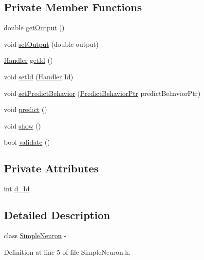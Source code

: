 \subsection*{Private Member Functions}
\begin{DoxyCompactItemize}
\item 
double \hyperlink{class_simple_neuron_ae5a325412827ad1f63e2a75f82023267}{getOutput} ()
\item 
void \hyperlink{class_simple_neuron_af59d76e80aea2bb224b817390f083bf9}{setOutput} (double output)
\item 
\hyperlink{_a_m_o_r_e_8h_abc871abb71cff6655b8172ee7240b8ef}{Handler} \hyperlink{class_simple_neuron_a2ed8cdd977472afaecca2c6b27c6beef}{getId} ()
\item 
void \hyperlink{class_simple_neuron_a7330de5a6a79925b950f78a65c529297}{setId} (\hyperlink{_a_m_o_r_e_8h_abc871abb71cff6655b8172ee7240b8ef}{Handler} Id)
\item 
void \hyperlink{class_simple_neuron_a8f230b4566e85adda71c7e0633d8a20d}{setPredictBehavior} (\hyperlink{_a_m_o_r_e_8h_a1fb2f1f8fdf1e08c42ef4bdce436af93}{PredictBehaviorPtr} predictBehaviorPtr)
\item 
void \hyperlink{class_simple_neuron_a232e6c3a7205372e3ccb7e93f26c58b6}{predict} ()
\item 
void \hyperlink{class_simple_neuron_afea22112336409283a5bb7d281f7f4bd}{show} ()
\item 
bool \hyperlink{class_simple_neuron_a9e7173abb892281d0b2ffb0efc82f0e5}{validate} ()
\end{DoxyCompactItemize}
\subsection*{Private Attributes}
\begin{DoxyCompactItemize}
\item 
int \hyperlink{class_simple_neuron_ad87b0b67c7f8bfe5377313c1e3fac60c}{d\_\-Id}
\end{DoxyCompactItemize}


\subsection{Detailed Description}
class \hyperlink{class_simple_neuron}{SimpleNeuron} -\/ 

Definition at line 5 of file SimpleNeuron.h.



